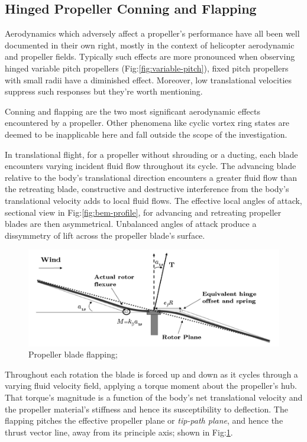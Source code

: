 \subsection{Hinged Propeller Conning and Flapping}
\label{subsec:dynamics.aero.flap}
Aerodynamics which adversely affect a propeller's performance have all been well documented in their own right, mostly in the context of helicopter aerodynamic and propeller fields\cite{basichelicopter,bramwell}. Typically such effects are more pronounced when observing hinged variable pitch propellers (Fig:\ref{fig:variable-pitch}), fixed pitch propellers with small radii have a diminished effect. Moreover, low translational velocities suppress such responses but they're worth mentioning.
\par
Conning and flapping are the two most significant aerodynamic effects encountered by a propeller. Other phenomena like cyclic vortex ring states are deemed to be inapplicable here and fall outside the scope of the investigation. 
\par
In translational flight, for a propeller without shrouding or a ducting, each blade encounters varying incident fluid flow throughout its cycle. The advancing blade relative to the body's translational direction encounters a greater fluid flow than the retreating blade, constructive and destructive interference from the body's translational velocity adds to local fluid flows. The effective local angles of attack, sectional view in Fig:\ref{fig:bem-profile}, for advancing and retreating propeller blades are then asymmetrical. Unbalanced angles of attack produce a dissymmetry of lift across the propeller blade's surface.
\par
\begin{figure}[htbp]
\centering
\includegraphics[width=\textwidth]{figs/prop-flap}
\caption{Propeller blade flapping; \cite{starmac}}
\label{fig:prop-flap}
\end{figure}
\par
Throughout each rotation the blade is forced up and down as it cycles through a varying fluid velocity field, applying a torque moment about the propeller's hub. That torque's magnitude is a function of the body's net translational velocity and the propeller material's stiffness and hence its susceptibility to deflection. The flapping pitches the effective propeller plane or \emph{tip-path plane}, and hence the thrust vector line, away from its principle axis; shown in Fig:\ref{fig:prop-flap}.
